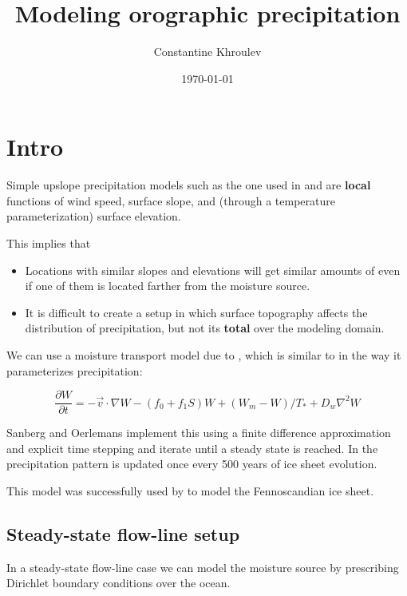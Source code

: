 \documentclass[11pt]{article}
\author{Constantine Khroulev}
\date{\today}
\title{Modeling orographic precipitation}
\begin{document}
\maketitle
\tableofcontents


\section{Intro}
\label{sec-1}

Simple upslope precipitation models such as the one used in
\cite{roe2003orographic} and \cite{roe1999wobbly} are \textbf{local}
functions of wind speed, surface slope, and (through a temperature
parameterization) surface elevation.

This implies that
\begin{itemize}
\item Locations with similar slopes and elevations will get similar
amounts of even if one of them is located farther from the
moisture source.
\item It is difficult to create a setup in which surface topography
affects the distribution of precipitation, but not its \textbf{total}
over the modeling domain.
\end{itemize}

We can use a moisture transport model due to
\cite{sanberg1983modelling}, which is similar to
\cite{roe2003orographic} in the way it parameterizes precipitation:

\begin{equation}
\frac{\partial W}{\partial t} = -\vec v \cdot \nabla W - (f_0 + f_1 S) W + (W_m - W) / T_{*} + D_w \nabla^2 W
\end{equation}

Sanberg and Oerlemans implement this using a finite difference
approximation and explicit time stepping and iterate until a steady
state is reached. In \cite{sanberg1983modelling} the precipitation
pattern is updated once every 500 years of ice sheet evolution.

This model was successfully used by \cite{letreguilly1993modelling}
to model the Fennoscandian ice sheet.

\subsection{Steady-state flow-line setup}
\label{sec-1-1}

In a steady-state flow-line case we can model the moisture source
by prescribing Dirichlet boundary conditions over the ocean.
\end{document}
